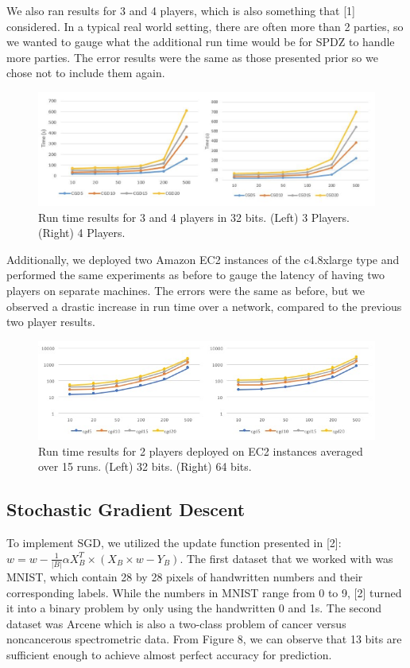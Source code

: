 \documentclass{article}
\theoremstyle{plain}
\theoremstyle{definition}
\theoremstyle{remark}
\begin{document}
We also ran results for 3 and 4 players, which is also something that [1] considered. In a typical real world setting, there are often more than 2 parties, so we wanted to gauge what the additional run time would be for SPDZ to handle more parties. The error results were the same as those presented prior so we chose not to include them again. 

\begin{figure}[h]
\centering
  \includegraphics[scale=0.6]{multi.jpg}
  \caption{Run time results for 3 and 4 players in 32 bits. (Left) 3 Players. (Right) 4 Players.}
  \label{fig:result4}
\end{figure}

\noindent
Additionally, we deployed two Amazon EC2 instances of the c4.8xlarge type and performed the same experiments as before to gauge the latency of having two players on separate machines. The errors were the same as before, but we observed a drastic increase in run time over a network, compared to the previous two player results. 

\begin{figure}[h]
\centering
  \includegraphics[scale=0.7]{ec2.jpg}
  \caption{Run time results for 2 players deployed on EC2 instances averaged over 15 runs. (Left) 32 bits. (Right) 64 bits.}
  \label{fig:result4}
\end{figure}

\subsection{Stochastic Gradient Descent}

To implement SGD, we utilized the update function presented in [2]: $ w = w - \frac{1}{|B|} \alpha X^{T}_{B} \times (X_{B} \times w - Y_{B})$. The first dataset that we worked with was MNIST, which contain 28 by 28 pixels of handwritten numbers and their corresponding labels. While the numbers in MNIST range from 0 to 9, [2] turned it into a binary problem by only using the handwritten 0 and 1s. The second dataset was Arcene which is also a two-class problem of cancer versus noncancerous spectrometric data. From Figure 8, we can observe that 13 bits are sufficient enough to achieve almost perfect accuracy for prediction.
\end{document}
